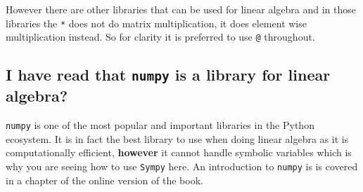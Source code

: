 However there are other libraries that can be used for linear algebra and in
those libraries the \texttt{*} does not do matrix multiplication, it does element wise
multiplication instead. So for clarity it is preferred to use \texttt{@} throughout.


\subsection{I have read that \texttt{numpy} is a library for linear algebra?}
\label{\detokenize{tools-for-mathematics/04-matrices/why/main:i-have-read-that-numpy-is-a-library-for-linear-algebra}}

\texttt{numpy} is one of the most popular and important libraries in the Python
ecosystem. It is in fact the best library to use when doing linear algebra as it
is computationally efficient, \textbf{however} it cannot handle symbolic variables
which is why you are seeing how to use \texttt{Sympy} here. An introduction to
\texttt{numpy} is is covered in a chapter of the online version of the
book.
